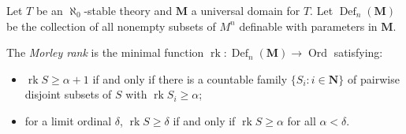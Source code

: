 Let $T$ be an $\aleph_0$-stable theory and $\mathbf{M}$ a universal domain for $T$. Let $\operatorname{Def}_n(\mathbf{M})$ be the collection of all nonempty subsets of $M^n$ definable with parameters in $\mathbf{M}$.

The \textit{Morley rank} is the minimal function $\operatorname{rk} : \operatorname{Def}_n(\mathbf{M}) \to \operatorname{Ord}$ satisfying:

\begin{itemize}
\item $\operatorname{rk} S \geq \alpha + 1$ if and only if there is a countable family $\{S_i : i \in \mathbf{N}\}$ of pairwise disjoint subsets of $S$ with $\operatorname{rk} S_i \geq \alpha$;
\item for a limit ordinal $\delta$, $\operatorname{rk} S \geq \delta$ if and only if $\operatorname{rk} S \geq \alpha$ for all $\alpha < \delta$.
\end{itemize}
